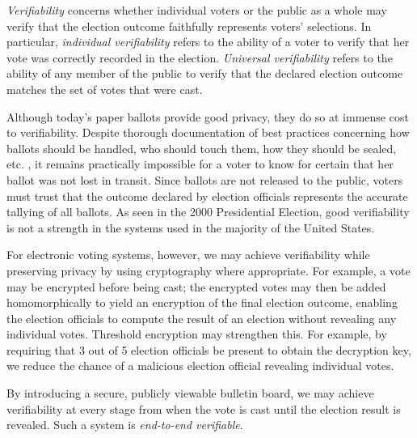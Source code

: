 \emph{Verifiability} concerns whether individual voters or the public as a whole may verify that the election outcome faithfully represents voters' selections. In particular, \emph{individual verifiability} refers to the ability of a voter to verify that her vote was correctly recorded in the election. \emph{Universal verifiability} refers to the ability of any member of the public to verify that the declared election outcome matches the set of votes that were cast.

Although today's paper ballots provide good privacy, they do so at immense cost to verifiability. Despite thorough documentation of best practices concerning how ballots should be handled, who should touch them, how they should be sealed, etc. \cite{ace-electoral-network}, it remains practically impossible for a voter to know for certain that her ballot was not lost in transit. Since ballots are not released to the public, voters must trust that the outcome declared by election officials represents the accurate tallying of all ballots. As seen in the 2000 Presidential Election, good verifiability is not a strength in the systems used in the majority of the United States.

For electronic voting systems, however, we may achieve verifiability while preserving privacy by using cryptography where appropriate. For example, a vote may be encrypted before being cast; the encrypted votes may then be added homomorphically to yield an encryption of the final election outcome, enabling the election officials to compute the result of an election without revealing any individual votes. Threshold encryption may strengthen this. For example, by requiring that 3 out of 5 election officials be present to obtain the decryption key, we reduce the chance of a malicious election official revealing individual votes.

By introducing a secure, publicly viewable bulletin board, we may achieve verifiability at every stage from when the vote is cast until the election result is revealed. Such a system is \emph{end-to-end verifiable}.

